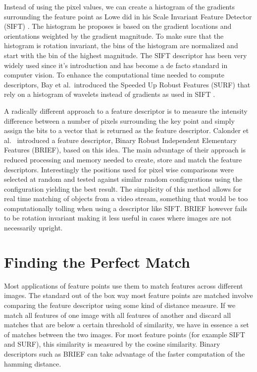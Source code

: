 Instead of using the pixel values, we can create a histogram of the 
gradients surrounding the feature point as Lowe did in his Scale 
Invariant Feature Detector (SIFT) \cite{lowe2004sift}. The histogram he 
proposes is based on the gradient locations and orientations weighted by
the gradient magnitude. To make sure that the histogram is rotation 
invariant, the bins of the histogram are normalized and start with the 
bin of the highest magnitude. The SIFT descriptor has been very widely 
used since it's introduction and has become a de facto standard in 
computer vision. To enhance the computational time needed to compute 
descriptors, Bay et al.\ introduced the Speeded Up Robust Features 
(SURF) that rely on a histogram of wavelets instead of gradients as used 
in SIFT \cite{bay2006surf}. 

A radically different approach to a feature descriptor is to measure the
intensity difference between a number of pixels surrounding the key 
point and simply assign the bits to a vector that is returned as the 
feature descriptor. Calonder et al.\ \cite{calonder2010brief} introduced 
a feature descriptor, Binary Robust Independent Elementary Features 
(BRIEF), based on this idea. The main advantage of their approach is 
reduced processing and memory needed to create, store and match the 
feature descriptors. Interestingly the positions used for pixel wise 
comparisons were selected at random and tested against similar random 
configurations using the configuration yielding the best result. The 
simplicity of this method allows for real time matching of objects from 
a video stream, something that would be too computationally tolling when 
using a descriptor like SIFT\@. BRIEF however fails to be rotation 
invariant making it less useful in cases where images are not 
necessarily upright.

\section{Finding the Perfect Match}

Most applications of feature points use them to match features across 
different images. The standard out of the box way most feature points 
are matched involve comparing the feature descriptor using some kind of 
distance measure. If we match all features of one image with all 
features of another and discard all matches that are below a certain 
threshold of similarity, we have in essence a set of matches between the
two images. For most feature points (for example SIFT and SURF), this 
similarity is measured by the cosine similarity. Binary descriptors such
as BRIEF can take advantage of the faster computation of the hamming 
distance.

